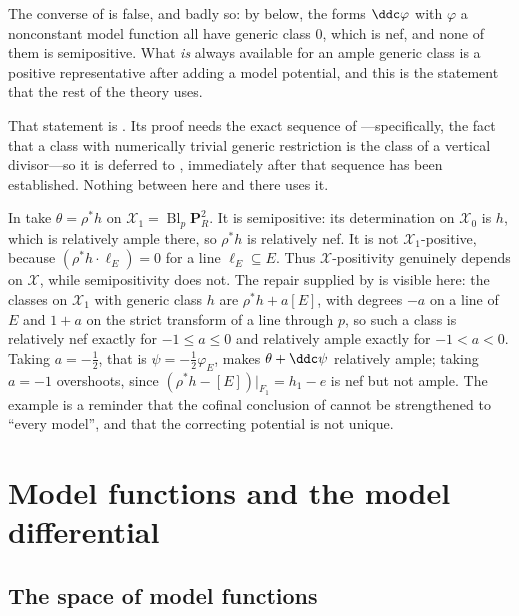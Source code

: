 The converse of  is false, and
badly so: by  below, the forms
$\ddc\varphi$ with $\varphi$ a nonconstant model function all have
generic class $0$, which is nef, and none of them is semipositive.  What
\emph{is} always available for an ample generic class is a positive
representative after adding a model potential, and this is the statement
that the rest of the theory uses.

That statement is .  Its proof needs
the exact sequence of ---specifically, the fact that a
class with numerically trivial generic restriction is the class of a
vertical divisor---so it is deferred to
, immediately after that sequence has
been established.  Nothing between here and there uses it.

\begin{example}
\label{ex:ch20-nef-not-ample}
In  take $\theta=\rho^*h$ on
$\mathcal X_1=\operatorname{Bl}_p\mathbf P^2_R$.  It is semipositive: its
determination on $\mathcal X_0$ is $h$, which is relatively ample there,
so $\rho^*h$ is relatively nef.  It is not $\mathcal X_1$-positive,
because $(\rho^*h\cdot\ell_E)=0$ for a line $\ell_E\subseteq E$.  Thus
$\mathcal X$-positivity genuinely depends on $\mathcal X$, while
semipositivity does not.  The repair supplied by
 is visible here: the classes on
$\mathcal X_1$ with generic class $h$ are $\rho^*h+a[E]$, with degrees
$-a$ on a line of $E$ and $1+a$ on the strict transform of a line
through $p$, so such a class is relatively nef exactly for
$-1\leq a\leq0$ and relatively ample exactly for $-1<a<0$.  Taking
$a=-\tfrac12$, that is $\psi=-\tfrac12\varphi_E$, makes
$\theta+\ddc\psi$ relatively ample; taking $a=-1$ overshoots, since
$(\rho^*h-[E])|_{F_1}=h_1-e$ is nef but not ample.  The example is a
reminder that the cofinal conclusion of
 cannot be strengthened to ``every
model'', and that the correcting potential is not unique.
\end{example}

\section{Model functions and the model differential}
\label{sec:ch20-ddc}

\subsection{The space of model functions}
\label{sec:ch20-model-function-space}

